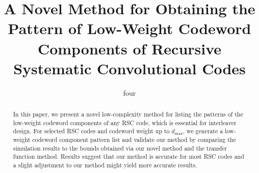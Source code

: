 \documentclass[journal,draftcls,onecolumn,12pt,twoside]{IEEEtran}
\begin{document}
\title{
A Novel Method for Obtaining the Pattern of Low-Weight Codeword Components of Recursive Systematic Convolutional Codes}
\author{%
  four
}


\maketitle
\begin{abstract}

In this paper, we present a novel low-complexity method for listing the patterns of the low-weight codeword components of any RSC code, which is essential for interleaver design. 
For selected RSC codes and codeword weight up to $d_{\text{max}}$, we generate a low-weight codeword component pattern list and validate our method by comparing the simulation results to the bounds obtained via our novel method and the transfer function method. Results suggest that our method is accurate for most RSC codes and a slight adjustment to our method might yield more accurate results.
\end{abstract}
\newpage

\newpage

\newpage

\newpage
%

\newpage

\newpage

\newpage

\newpage

\end{document}
